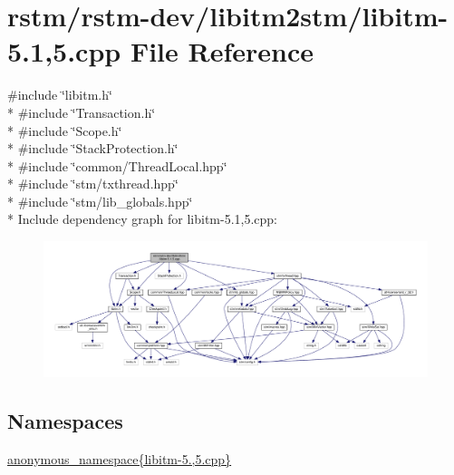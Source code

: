 \hypertarget{libitm-5_81_005_8cpp}{\section{rstm/rstm-\/dev/libitm2stm/libitm-\/5.1,5.cpp File Reference}
\label{libitm-5_81_005_8cpp}
}
{\ttfamily \#include \char`\"{}libitm.\-h\char`\"{}}\\*
{\ttfamily \#include \char`\"{}Transaction.\-h\char`\"{}}\\*
{\ttfamily \#include \char`\"{}Scope.\-h\char`\"{}}\\*
{\ttfamily \#include \char`\"{}Stack\-Protection.\-h\char`\"{}}\\*
{\ttfamily \#include \char`\"{}common/\-Thread\-Local.\-hpp\char`\"{}}\\*
{\ttfamily \#include \char`\"{}stm/txthread.\-hpp\char`\"{}}\\*
{\ttfamily \#include \char`\"{}stm/lib\-\_\-globals.\-hpp\char`\"{}}\\*
Include dependency graph for libitm-\/5.1,5.cpp\-:
\nopagebreak
\begin{figure}[H]
\begin{center}
\leavevmode
\includegraphics[width=350pt]{libitm-5_81_005_8cpp__incl}
\end{center}
\end{figure}
\subsection*{Namespaces}
\begin{DoxyCompactItemize}
\item 
\hyperlink{namespaceanonymous__namespace_02libitm-5_81_005_8cpp_03}{anonymous\-\_\-namespace\{libitm-\/5.,5.\-cpp\}}
\end{DoxyCompactItemize}
